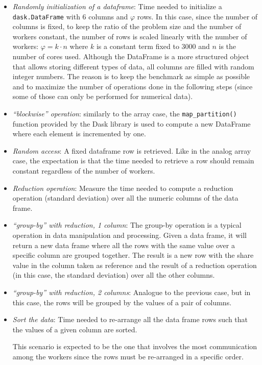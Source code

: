 \begin{itemize}
  \itemsep0em
  \item \textit{Randomly initialization of a dataframe}: Time needed to
    initialize a  \texttt{dask.DataFrame} with $6$ columns and $\varphi$ rows.
    In this case, since the number of columns is fixed, to keep the ratio of the
    problem size and the number of workers constant, the number of rows is
    scaled linearly with the number of workers: $\varphi = k \cdot n$ where $k$
    is a constant term fixed to $3000$ and $n$ is the number of cores used.
    Although the DataFrame is a more structured object that allows storing
    different types of data, all columns are filled with random integer numbers.
    The reason is to keep the benchmark as simple as possible and to maximize
    the number of operations done in the following steps (since some of those
    can only be performed for numerical data).
  \item \textit{``blockwise'' operation}: similarly to the array case, the
    \texttt{map\_partition()} function provided by the Dask library is used to
    compute a new DataFrame where each element is incremented by one.
  \item \textit{Random access}: A fixed dataframe row is retrieved.
    Like in the analog array case, the expectation is that the time needed to
    retrieve a row should remain constant regardless of the number of workers.
  \item \textit{Reduction operation}: Measure the time needed to compute a
    reduction operation (standard deviation) over all the numeric columns of the
    data frame.
  \item \textit{``group-by'' with reduction, 1 column}: The group-by operation
    is a typical operation in data manipulation and processing. Given a data
    frame, it will return a new data frame where all the rows with the same
    value over a specific column are grouped together. The result is a new row
    with the share value in the column taken as reference and the result of a
    reduction operation (in this case, the standard deviation) over all the
    other columns.
  \item \textit{``group-by'' with reduction, 2 columns}: Analogue to the
    previous case, but in this case, the rows will be grouped by the values of a
    pair of columns.
  \item \textit{Sort the data}: Time needed to re-arrange all the data frame
    rows such that the values of a given column are sorted.

    This scenario is expected to be the one that involves the most communication
    among the workers since the rows must be re-arranged in a specific order.
\end{itemize}

